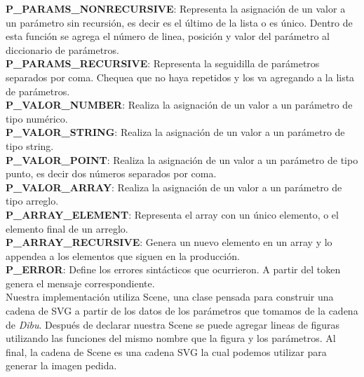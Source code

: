 \textbf{P_PARAMS_NONRECURSIVE}: Representa la asignación de un valor a un parámetro sin recursión, es decir es el último de la lista o es único. Dentro de esta función se agrega
el número de linea, posición y valor del parámetro al diccionario de parámetros.\\

\textbf{P_PARAMS_RECURSIVE}: Representa la seguidilla de parámetros separados por coma. Chequea que no haya repetidos y los va agregando a la lista de parámetros.\\

\textbf{P_VALOR_NUMBER}: Realiza la asignación de un valor a un parámetro de tipo numérico.\\

\textbf{P_VALOR_STRING}: Realiza la asignación de un valor a un parámetro de tipo string.\\

\textbf{P_VALOR_POINT}: Realiza la asignación de un valor a un parámetro de tipo punto, es decir dos números separados por coma.\\

\textbf{P_VALOR_ARRAY}: Realiza la asignación de un valor a un parámetro de tipo arreglo.\\

\textbf{P_ARRAY_ELEMENT}: Representa el array con un único elemento, o el elemento final de un arreglo.\\

\textbf{P_ARRAY_RECURSIVE}: Genera un nuevo elemento en un array y lo appendea a los elementos que siguen en la producción.\\

\textbf{P_ERROR}: Define los errores sintácticos que ocurrieron. A partir del token genera el mensaje correspondiente.\\

Nuestra implementación utiliza Scene, una clase pensada para construir una cadena de SVG a partir de los datos de los
parámetros que tomamos de la cadena de \textit{Dibu}. Después de declarar nuestra Scene se puede agregar lineas de
figuras utilizando las funciones del mismo nombre que la figura y los parámetros. Al final, la cadena de Scene es una
cadena SVG la cual podemos utilizar para generar la imagen pedida.\\

